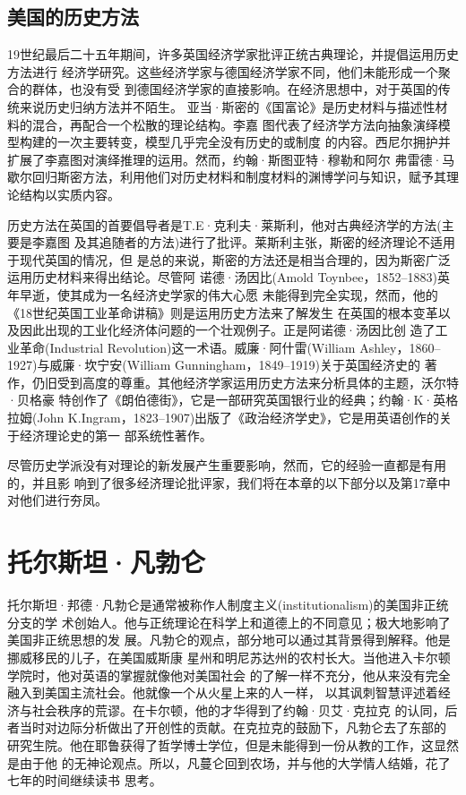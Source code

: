 \subsection{美国的历史方法}

19世纪最后二十五年期间，许多英国经济学家批评正统古典理论，并提倡运用历史方法进行
经济学研究。这些经济学家与德国经济学家不同，他们未能形成一个聚合的群体，也没有受
到德国经济学家的直接影响。在经济思想中，对于英国的传统来说历史归纳方法并不陌生。
亚当·斯密的《国富论》是历史材料与描述性材料的混合，再配合一个松散的理论结构。李嘉
图代表了经济学方法向抽象演绎模型构建的一次主要转变，模型几乎完全没有历史的或制度
的内容。西尼尔拥护并扩展了李嘉图对演绎推理的运用。然而，约翰·斯图亚特·穆勒和阿尔
弗雷德·马歇尔回归斯密方法，利用他们对历史材料和制度材料的渊博学问与知识，赋予其理
论结构以实质内容。

历史方法在英国的首要倡导者是T.E·克利夫·莱斯利，他对古典经济学的方法(主要是李嘉图
及其追随者的方法)进行了批评。莱斯利主张，斯密的经济理论不适用于现代英国的情况，但
是总的来说，斯密的方法还是相当合理的，因为斯密广泛运用历史材料来得出结论。尽管阿
诺德·汤因比(Amold Toynbee，1852--1883)英年早逝，使其成为一名经济史学家的伟大心愿
未能得到完全实现，然而，他的《18世纪英国工业革命讲稿》则是运用历史方法来了解发生
在英国的根本变革以及因此出现的工业化经济体问题的一个壮观例子。正是阿诺德·汤因比创
造了工业革命(Industrial Revolution)这一术语。威廉·阿什雷(William
Ashley，1860--1927)与威廉·坎宁安(William Gunningham，1849--1919)关于英国经济史的
著作，仍旧受到高度的尊重。其他经济学家运用历史方法来分析具体的主题，沃尔特·贝格豪
特创作了《朗伯德街》，它是一部研究英国银行业的经典；约翰·K·英格拉姆(John
K.Ingram，1823--1907)出版了《政治经济学史》，它是用英语创作的关于经济理论史的第一
部系统性著作。

尽管历史学派没有对理论的新发展产生重要影响，然而，它的经验一直都是有用的，并且影
响到了很多经济理论批评家，我们将在本章的以下部分以及第17章中对他们进行夯凤。

\section{托尔斯坦·凡勃仑}

托尔斯坦·邦德·凡勃仑是通常被称作人制度主义(institutionalism)的美国非正统分支的学
术创始人。他与正统理论在科学上和道德上的不同意见；极大地影响了美国非正统思想的发
展。凡勃仑的观点，部分地可以通过其背景得到解释。他是挪威移民的儿子，在美国威斯康
星州和明尼苏达州的农村长大。当他进入卡尔顿学院时，他对英语的掌握就像他对美国社会
的了解一样不充分，他从来没有完全融入到美国主流社会。他就像一个从火星上来的人一样，
以其讽刺智慧评述着经济与社会秩序的荒谬。在卡尔顿，他的才华得到了约翰·贝艾·克拉克
的认同，后者当时对边际分析做出了开创性的贡献。在克拉克的鼓励下，凡勃仑去了东部的
研究生院。他在耶鲁获得了哲学博士学位，但是未能得到一份从教的工作，这显然是由于他
的无神论观点。所以，凡蔓仑回到农场，并与他的大学情人结婚，花了七年的时间继续读书
思考。

